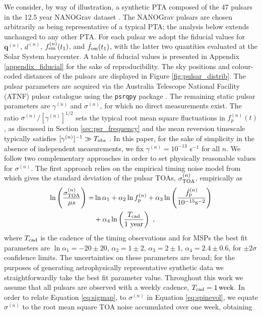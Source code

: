 \documentclass[fleqn,usenatbib,useAMS]{mnras}
\begin{document}
We consider, by way of illustration, a synthetic PTA composed of the 47 pulsars in the 12.5 year NANOGrav dataset \citep{2020ApJ...905L..34A}. The NANOGrav pulsars are chosen arbitrarily as being representative of a typical PTA; the analysis below extends unchanged to any other PTA. For each pulsar we adopt the fiducial values for ${\boldsymbol{q}}^{(n)}$, $d^{(n)}$, $f_{\rm em}^{(n)}(t_1)$, and $\dot{f}_{\rm em}(t_1)$, with the latter two quantities evaluated at the Solar System barycenter. A table of fiducial values is presented in Appendix \ref{appendix_fiducial} for the sake of reproducibility. The sky positions and colour-coded distances of the pulsars are displayed in Figure \ref{fig:pulsar_distrib}. The pulsar parameters are acquired via the Australia Telescope National Facility (ATNF) pulsar catalogue \citep{Manchester2005} using the \texttt{psrqpy} package \citep{psrqpy}. The remaining static pulsar parameters are $\gamma^{(n)}$ and $\sigma^{(n)}$, for which no direct measurements exist. The ratio $\sigma^{(n)} / [\gamma^{(n)}]^{1/2}$ sets the typical root mean square fluctuations in $f_p^{(n)}(t)$, as discussed in Section \ref{sec:psr_frequency} and the mean reversion timescale typically satisfies $[\gamma^{(n)}]^{-1} \gg T_{\rm obs}$ \citep{Price2012,Myers2021MNRAS.502.3113M,Meyers2021,Vargas}. In this paper, for the sake of simplicity in the absence of independent measurements, we fix $\gamma^{(n)} = 10^{-13}$ s$^{-1}$ for all $n$. We follow two complementary approaches in order to  set physically reasonable values for $\sigma^{(n)}$. The first approach relies on the empirical timing noise model from \cite{Shannon2010ApJ...725.1607S} which gives the standard deviation of the pulsar TOAs, $\sigma_{\rm TOA}^{(n)}$, empirically as
\begin{align}
	\ln \left(\frac{\sigma_{\rm TOA}^{(n)}}{\mu s} \right)=& \ln \alpha_1 +  \alpha_2 \ln f_{\rm p}^{(n)} + \alpha_3 \ln \left(\frac{\dot{f}_{\rm p}^{(n)}}{10^{-15} \text{s}^{-2}} \right) \nonumber \\ 
	&+ \alpha_4 \ln \left( \frac{T_{\rm cad}}{ 1 \text{ year}} \right) \ , \label{eq:sigmap}
\end{align}
where $T_{\rm cad}$ is the cadence of the timing observations and for MSPs the best fit parameters are $\ln \alpha_1 = -20 \pm 20$, $\alpha_2 = 1 \pm 2 $, $\alpha_3 = 2 \pm 1$, $\alpha_4 = 2.4 \pm 0.6$, for $\pm 2\sigma$ confidence limits. The uncertainties on these parameters are broad; for the purposes of generating astrophysically representative synthetic data we straightforwardly take the best fit parameter value. Throughout this work we assume that all pulsars are observed with a weekly cadence, $T_{\rm cad} = 1 \,{\rm week}$. In order to relate Equation \eqref{eq:sigmap}, to $\sigma^{(n)}$ in Equation \eqref{eq:spinevol}, we equate $\sigma^{(n)}$ to the root mean square TOA noise accumulated over one week, obtaining
\end{document}
